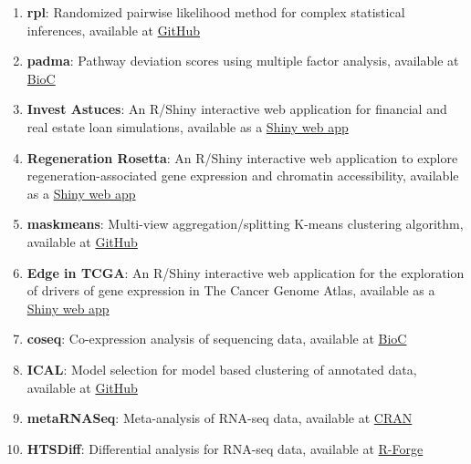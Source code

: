 \documentclass[11pt, a4paper]{awesome-cv}
\providecommand{\tightlist}{%
	\setlength{\itemsep}{0pt}\setlength{\parskip}{0pt}}
\begin{document}
\begin{enumerate}
\def\labelenumi{\arabic{enumi}.}
\tightlist
\item
  \textbf{rpl}: Randomized pairwise likelihood method for complex
  statistical inferences, available at
  \href{https://github.com/andreamrau/rpl}{GitHub}\\
\item
  \textbf{padma}: Pathway deviation scores using multiple factor
  analysis, available at
  \href{https://bioconductor.org/packages/padma/}{BioC}\\
\item
  \textbf{Invest Astuces}: An R/Shiny interactive web application for
  financial and real estate loan simulations, available as a
  \href{https://investastuces.com/simulateurs/}{Shiny web app}\\
\item
  \textbf{Regeneration Rosetta}: An R/Shiny interactive web application
  to explore regeneration-associated gene expression and chromatin
  accessibility, available as a
  \href{http://ls-shiny-prod.uwm.edu/rosetta/}{Shiny web app}\\
\item
  \textbf{maskmeans}: Multi-view aggregation/splitting K-means
  clustering algorithm, available at
  \href{https://github.com/andreamrau/maskmeans}{GitHub}\\
\item
  \textbf{Edge in TCGA}: An R/Shiny interactive web application for the
  exploration of drivers of gene expression in The Cancer Genome Atlas,
  available as a \href{http://ls-shiny-prod.uwm.edu/edge_in_tcga/}{Shiny
  web app}\\
\item
  \textbf{coseq}: Co-expression analysis of sequencing data, available
  at \href{https://bioconductor.org/packages/coseq/}{BioC}\\
\item
  \textbf{ICAL}: Model selection for model based clustering of annotated
  data, available at \href{https://github.com/Gallopin/ICAL}{GitHub}\\
\item
  \textbf{metaRNASeq}: Meta-analysis of RNA-seq data, available at
  \href{https://cran.r-project.org/web/packages/metaRNASeq/index.html}{CRAN}\\
\item
  \textbf{HTSDiff}: Differential analysis for RNA-seq data, available at
  \href{https://r-forge.r-project.org/R/?group_id=1504}{R-Forge}\\

\end{enumerate}
\end{document}
